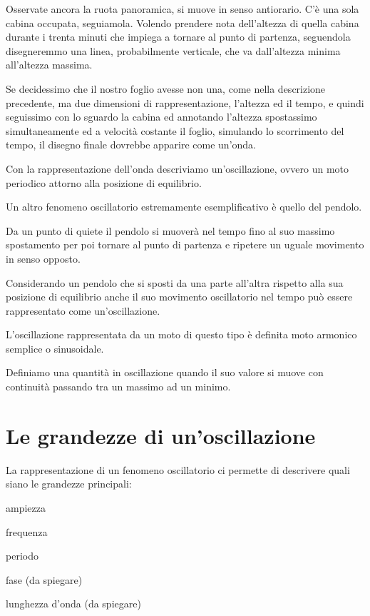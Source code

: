 	

Osservate ancora la ruota panoramica, si muove in senso antiorario. C'è una
sola cabina occupata, seguiamola. Volendo prendere nota dell'altezza di quella
cabina durante i trenta minuti che impiega a tornare al punto di partenza,
seguendola disegneremmo una linea, probabilmente verticale, che va dall'altezza
minima all'altezza massima.



Se decidessimo che il nostro foglio avesse non una, come nella descrizione
precedente, ma due dimensioni di rappresentazione, l'altezza ed il tempo, e
quindi seguissimo con lo sguardo la cabina ed annotando l'altezza spostassimo
simultaneamente ed a velocità costante il foglio, simulando lo scorrimento del
tempo, il disegno finale dovrebbe apparire come un'onda.



Con la rappresentazione dell'onda descriviamo un'oscillazione, ovvero un moto
periodico attorno alla posizione di equilibrio.

Un altro fenomeno oscillatorio estremamente esemplificativo è quello del pendolo.

Da un punto di quiete il pendolo si muoverà nel tempo fino al suo massimo
spostamento per poi tornare al punto di partenza e ripetere un uguale movimento
in senso opposto.

Considerando un pendolo che si sposti da una parte all'altra rispetto alla sua
posizione di equilibrio anche il suo movimento oscillatorio nel tempo può essere
rappresentato come un'oscillazione.



L'oscillazione rappresentata da un moto di questo tipo è definita moto armonico
semplice o sinusoidale.

Definiamo una quantità in oscillazione quando il suo valore si muove con
continuità passando tra un massimo ad un minimo.

\clearpage

\section{Le grandezze di un'oscillazione}

La rappresentazione di un fenomeno oscillatorio ci permette di descrivere
quali siano le grandezze principali:

\begin{compactitem}
	\item ampiezza
	\item frequenza
	\item periodo
	\item fase (da spiegare)
	\item lunghezza d'onda (da spiegare)
\end{compactitem}

